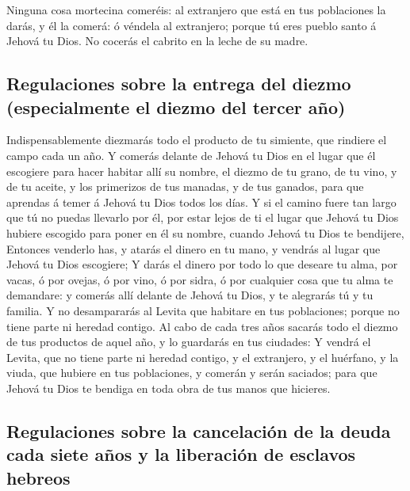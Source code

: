  Ninguna cosa mortecina comeréis: al extranjero que está
en tus poblaciones la darás, y él la comerá: ó véndela al extranjero;
porque tú eres pueblo santo á Jehová tu Dios. No cocerás el cabrito en
la leche de su madre.

\hypertarget{regulaciones-sobre-la-entrega-del-diezmo-especialmente-el-diezmo-del-tercer-auxf1o}{%
\subsection{Regulaciones sobre la entrega del diezmo (especialmente el
diezmo del tercer
año)}\label{regulaciones-sobre-la-entrega-del-diezmo-especialmente-el-diezmo-del-tercer-auxf1o}}

 Indispensablemente diezmarás todo el producto de tu
simiente, que rindiere el campo cada un año.  Y comerás
delante de Jehová tu Dios en el lugar que él escogiere para hacer
habitar allí su nombre, el diezmo de tu grano, de tu vino, y de tu
aceite, y los primerizos de tus manadas, y de tus ganados, para que
aprendas á temer á Jehová tu Dios todos los días.  Y si
el camino fuere tan largo que tú no puedas llevarlo por él, por estar
lejos de ti el lugar que Jehová tu Dios hubiere escogido para poner en
él su nombre, cuando Jehová tu Dios te bendijere, 
Entonces venderlo has, y atarás el dinero en tu mano, y vendrás al lugar
que Jehová tu Dios escogiere;  Y darás el dinero por todo
lo que deseare tu alma, por vacas, ó por ovejas, ó por vino, ó por
sidra, ó por cualquier cosa que tu alma te demandare: y comerás allí
delante de Jehová tu Dios, y te alegrarás tú y tu familia.
 Y no desampararás al Levita que habitare en tus
poblaciones; porque no tiene parte ni heredad contigo. 
Al cabo de cada tres años sacarás todo el diezmo de tus productos de
aquel año, y lo guardarás en tus ciudades:  Y vendrá el
Levita, que no tiene parte ni heredad contigo, y el extranjero, y el
huérfano, y la viuda, que hubiere en tus poblaciones, y comerán y serán
saciados; para que Jehová tu Dios te bendiga en toda obra de tus manos
que hicieres.

\hypertarget{regulaciones-sobre-la-cancelaciuxf3n-de-la-deuda-cada-siete-auxf1os-y-la-liberaciuxf3n-de-esclavos-hebreos}{%
\subsection{Regulaciones sobre la cancelación de la deuda cada siete
años y la liberación de esclavos
hebreos}\label{regulaciones-sobre-la-cancelaciuxf3n-de-la-deuda-cada-siete-auxf1os-y-la-liberaciuxf3n-de-esclavos-hebreos}}

